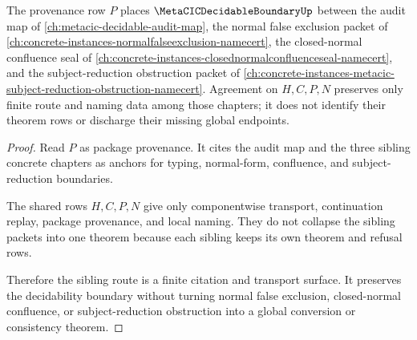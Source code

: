 \begin{theorem}
\label{thm:metacic-decidable-boundary-sibling-provenance}
The provenance row $P$ places $\MetaCICDecidableBoundaryUp$ between the audit map of \autoref{ch:metacic-decidable-audit-map}, the normal false exclusion packet of \autoref{ch:concrete-instances-normalfalseexclusion-namecert}, the closed-normal confluence seal of \autoref{ch:concrete-instances-closednormalconfluenceseal-namecert}, and the subject-reduction obstruction packet of \autoref{ch:concrete-instances-metacic-subject-reduction-obstruction-namecert}. Agreement on $H,C,P,N$ preserves only finite route and naming data among those chapters; it does not identify their theorem rows or discharge their missing global endpoints.
\end{theorem}
\begin{proof}
Read $P$ as package provenance. It cites the audit map and the three sibling concrete chapters as anchors for typing, normal-form, confluence, and subject-reduction boundaries.

The shared rows $H,C,P,N$ give only componentwise transport, continuation replay, package provenance, and local naming. They do not collapse the sibling packets into one theorem because each sibling keeps its own theorem and refusal rows.

Therefore the sibling route is a finite citation and transport surface. It preserves the decidability boundary without turning normal false exclusion, closed-normal confluence, or subject-reduction obstruction into a global conversion or consistency theorem.
\end{proof}

